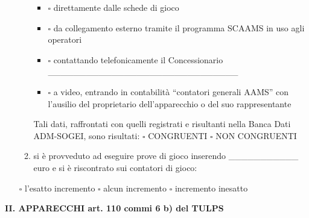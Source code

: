 \documentclass[12pt]{article}
\begin{document}
\begin{enumerate}[resume]
\begin{enumerate}
\begin{itemize}[label={}]
            \item \begin{math}\square\end{math} direttamente dalle schede di gioco
            \item \begin{math}\square\end{math} da collegamento esterno tramite il programma SCAAMS in uso agli operatori
            \item \begin{math}\square\end{math} contattando telefonicamente il Concessionario  \_\_\_\_\_\_\_\_\_\_\_\_\_\_\_\_\_\_\_\_\_\_\_\_\_\_\_\_\_\_
            \item \begin{math}\square\end{math} a video, entrando in contabilità “contatori generali AAMS” con l’ausilio del proprietario dell’apparecchio o del suo rappresentante
        \end{itemize}
        Tali dati, raffrontati con quelli registrati e risultanti nella Banca Dati ADM-SOGEI, sono risultati: \begin{math}\square\end{math} CONGRUENTI \begin{math}\square\end{math} NON CONGRUENTI
        \item si è provveduto ad eseguire prove di gioco inserendo \_\_\_\_\_\_\_\_\_\_\_ euro e si è riscontrato sui contatori di gioco:
    \end{enumerate}
    \begin{center}
        \begin{math}\square\end{math} l'esatto incremento \begin{math}\square\end{math} alcun incremento \begin{math}\square\end{math} incremento inesatto
    \end{center}
\end{enumerate}

\begin{center}
    \textbf{II.	APPARECCHI art. 110 commi 6 b) del TULPS }
\end{center}
\end{document}
